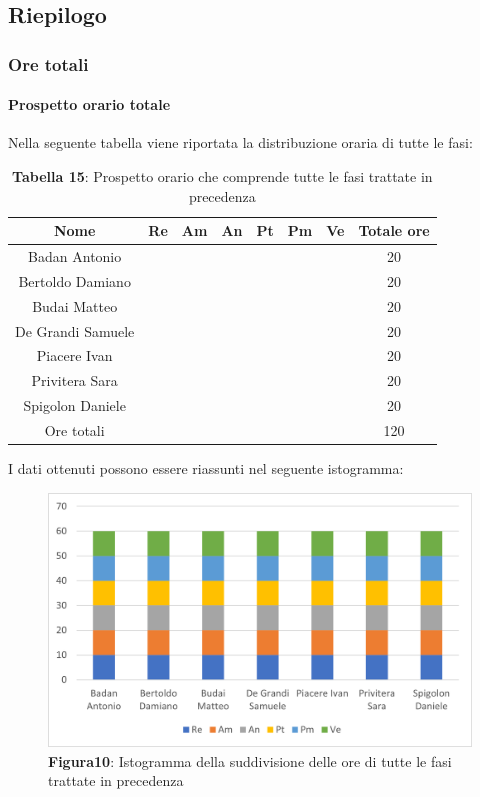 \subsection{Riepilogo}
\subsubsection{Ore totali}
\paragraph{Prospetto orario totale}
Nella seguente tabella viene riportata la distribuzione oraria di tutte le fasi:

\begin{table}[H]
	\centering
	\renewcommand{\arraystretch}{1.5}
	\begin{tabular}{|c|c|c|c|c|c|c|c|}
		\hline
		\rowcolor{lighter-grayer}
		Nome & Re & Am & An & Pt & Pm & Ve & Totale ore\\
		\hline
		Badan Antonio &  &  &  &  &  &  & 20 \\
		\hline
		Bertoldo Damiano&  &  &  &  &  &  & 20 \\
		\hline
		Budai Matteo&  &  &  &  &  &  & 20 \\
		\hline
		De Grandi Samuele&  &  &  &  &  &  & 20 \\
		\hline
		Piacere Ivan&  &  &  &  &  &  & 20 \\
		\hline
		Privitera Sara&  &  &  &  &  &  & 20 \\
		\hline
		Spigolon Daniele&  &  &  &  &  &  & 20 \\
		\hline
		Ore totali&  &  &  &  &  &  & 120 \\
		\hline
	\end{tabular}
	\caption*{\textbf{Tabella 15}: Prospetto orario che comprende tutte le fasi trattate in precedenza\\}
\end{table}	
I dati ottenuti possono essere riassunti nel seguente istogramma:

\begin{figure}[H]
	\centering
	\includegraphics[width=0.7\linewidth]{res/images/Figura10.png}
	\caption*{\textbf{Figura10}: Istogramma della suddivisione delle ore di tutte le fasi trattate in precedenza}
	\label{fig:Figura10}
\end{figure}

